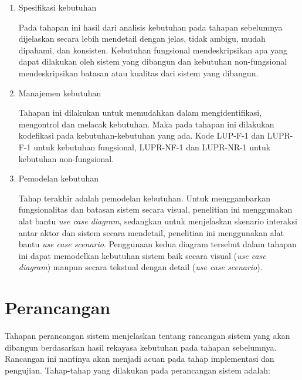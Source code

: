 \begin{enumerate}[
leftmargin=0pt, itemindent=20pt,
labelwidth=15pt, labelsep=5pt, listparindent=0.7cm,
align=left]
\item Spesifikasi kebutuhan

  Pada tahapan ini hasil dari analisis kebutuhan pada tahapan
  sebelumnya dijelaskan secara lebih mendetail dengan jelas, tidak
  ambigu, mudah dipahami, dan konsisten. Kebutuhan fungsional
  mendeskripsikan apa yang dapat dilakukan oleh sistem yang dibangun
  dan kebutuhan non-fungsional mendeskripsikan batasan atau
  kualitas dari sistem yang dibangun.

\item Manajemen kebutuhan

  Tahapan ini dilakukan untuk memudahkan dalam mengidentifikasi, mengontrol
  dan melacak kebutuhan. Maka pada tahapan ini dilakukan
  kodefikasi pada kebutuhan-kebutuhan yang ada. Kode LUP-F-1 dan
  LUPR-F-1 untuk kebutuhan fungsional, LUPR-NF-1 dan LUPR-NR-1 untuk
  kebutuhan non-fungsional.

\item Pemodelan kebutuhan

  Tahap terakhir adalah pemodelan kebutuhan. Untuk menggambarkan fungsionalitas
  dan batasan sistem secara visual, penelitian ini menggunakan alat bantu
  \emph{use case diagram}, sedangkan untuk menjelaskan skenario interaksi antar aktor
  dan sistem secara mendetail, penelitian ini menggunakan alat bantu \emph{use
    case scenario}. Penggunaan kedua diagram tersebut dalam tahapan ini dapat
  memodelkan kebutuhan sistem baik secara visual (\emph{use case diagram})
  maupun secara tekstual dengan detail (\emph{use case scenario}).

\end{enumerate}

\section{Perancangan}

Tahapan perancangan sistem menjelaskan tentang rancangan sistem yang
akan dibangun berdasarkan hasil rekayasa kebutuhan pada tahapan
sebelumnya. Rancangan ini nantinya akan menjadi acuan pada tahap
implementasi dan pengujian. Tahap-tahap yang dilakukan pada perancangan
sistem adalah:

